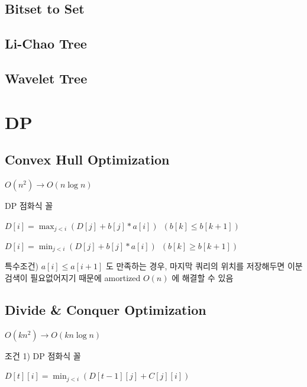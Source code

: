 \documentclass[9pt,landscape,a4paper,twocolumn]{extarticle}
\begin{document}
\subsection{Bitset to Set}


\subsection{Li-Chao Tree}


\subsection{Wavelet Tree}


\section{DP}
% 

\subsection{Convex Hull Optimization}
$O(n^{2}) \to O(n\log{n})$

DP 점화식 꼴

$D[i] = \max_{j<i}( D[j] + b[j] * a[i] ) \phantom{1} (b[k] \leq b[k+1])$

$D[i] = \min_{j<i}( D[j] + b[j] * a[i] ) \phantom{1} (b[k] \geq b[k+1])$

특수조건) $a[i] \leq a[i+1]$ 도 만족하는 경우, 마지막 쿼리의 위치를 저장해두면 이분검색이 필요없어지기 때문에 amortized $O(n)$ 에 해결할 수 있음



\subsection{Divide \& Conquer Optimization}

$O(kn^{2}) \to O(kn\log{n})$

조건 1) DP 점화식 꼴

$D[t][i] = \min_{j<i}( D[t-1][j] + C[j][i] )$
\end{document}
